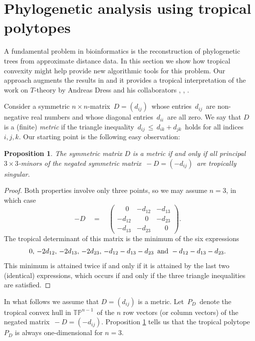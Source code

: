 \documentclass[11pt]{amsart}
\newtheorem{prop}[thm]{Proposition}
\newcommand{\TP}{\mathbb{TP}}
\begin{document}
\section{Phylogenetic analysis using tropical polytopes} \label{trees}

A fundamental problem in bioinformatics is the reconstruction
of phylogenetic trees from approximate distance data. 
In this section we show how tropical convexity
might help provide new algorithmic tools for this problem.
Our approach augments the results in \cite[\S 4]{SS}
and it provides a tropical interpretation of
the work on $T$-theory by Andreas Dress and his 
collaborators \cite{DHM},  \cite{DMT}, \cite{DT}.

Consider a symmetric $n \times n$-matrix $\, D = (d_{ij})\,$
whose entries $\, d_{ij}\,$ are non-negative real numbers
and whose diagonal entries $\, d_{ii} \,$ are all zero.
We say that $D$ is a (finite) \emph{metric} if the
triangle inequality $\, d_{ij} \, \leq \, d_{ik} + d_{jk}\,$ holds 
for all indices $i,j,k$.
Our starting point is the following easy observation:

\begin{prop} \label{metricspace}
The symmetric matrix $D$ is a metric
if and only if all principal $3 \times 3$-minors
of the negated symmetric matrix $\,-D = (-d_{ij})\,$
are tropically singular.
\end{prop}

\begin{proof}
Both properties involve only three points,
so we may assume $n =3$, in which case
$$ - D \quad = \quad 
\begin{pmatrix} 
\phantom{-} 0 &- d_{12} & - d_{13} \\
- d_{12} &\phantom{-} 0 & - d_{23} \\
- d_{13} & - d_{23} &\phantom{-} 0 
\end{pmatrix}. $$
The tropical determinant of this matrix is the minimum
of the six expressions
$$ 0, \, - 2 d_{12}, \, - 2 d_{13}, \, - 2 d_{23}, \, 
-d_{12}-d_{13}-d_{23}\, \, \, \hbox{and} \,\,
-d_{12}-d_{13}-d_{23} . $$
This minimum is attained twice if and only if
it is attained by the last two (identical) expressions,
which occurs if and only if
the three triangle inequalities are satisfied.
\end{proof}

In what follows we assume that $D = (d_{ij})$ is
a metric.
Let $\,P_D \,$ denote the
tropical convex hull in $ \TP^{n-1}\,$
 of the $n$ row vectors (or column vectors)
of the negated  matrix $\, -D = (-d_{ij})$.
Proposition \ref{metricspace} tells us
that the tropical polytope $P_D$ is always one-dimensional 
for $n = 3$.
\end{document}
